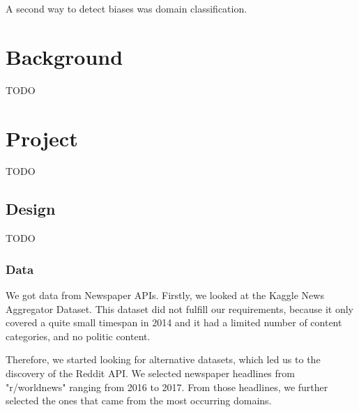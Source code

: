 \documentclass[final]{ieee}
\begin{document}
A second way to detect biases was domain classification.
            
            
\section{Background}
 
TODO
%            
%


\section{Project}

TODO

\subsection{Design}
TODO
\subsubsection{Data}
We got data from Newspaper APIs. Firstly, we looked at the Kaggle News Aggregator Dataset. %
This dataset did not fulfill our requirements, because it only covered a quite small timespan in 2014 and it had a limited number of content categories, and no politic content.

Therefore, we started looking for alternative datasets, which led us to the discovery of the Reddit API. We selected newspaper headlines from "r/worldnews" ranging from 2016 to 2017. From those headlines, we further selected the ones that came from the most occurring domains. %
\end{document}
